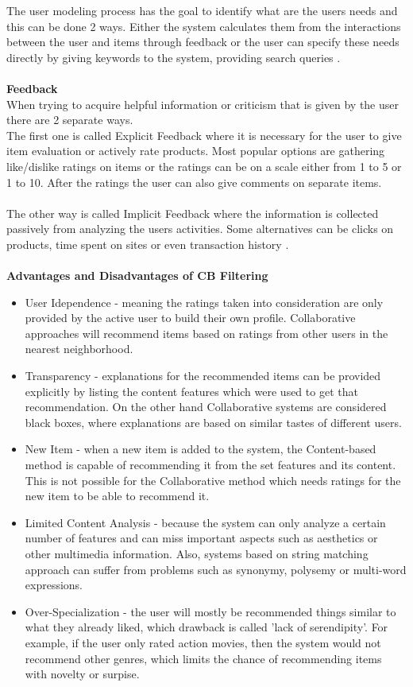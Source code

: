 \documentclass[\myFontSize,a4paper,oneside,english,hidelinks]{article}
\begin{document}
The user modeling process has the goal to identify what are the users needs and this can be done 2 ways. Either the system calculates them from the interactions between the user and items through feedback or the user can specify these needs directly by giving keywords to the system, providing search queries \cite{Beel2016305}. \\\\
%
%
\textbf{Feedback}\\
When trying to acquire helpful information or criticism that is given by the user there are 2 separate ways. \\
The first one is called Explicit Feedback where it is necessary for the user to give item evaluation or actively rate products. Most popular options are gathering like/dislike ratings on items or the ratings can be on a scale either from 1 to 5 or 1 to 10. After the ratings the user can also give comments on separate items. \\\\
The other way is called Implicit Feedback where the information is collected passively from analyzing the users activities. Some alternatives can be clicks on products, time spent on sites or even transaction history \cite{DeGemmis2015119}.\\\\
%
%
%
\textbf{Advantages and Disadvantages of CB Filtering}
\begin{itemize}
\item User Idependence - meaning the ratings taken into consideration are only provided by the active user to build their own profile. Collaborative approaches will recommend items based on ratings from other users in the nearest neighborhood.
\item Transparency - explanations for the recommended items can be provided explicitly by listing the content features which were used to get that recommendation. On the other hand Collaborative systems are considered black boxes, where explanations are based on similar tastes of different users.
\item New Item - when a new item is added to the system, the Content-based method is capable of recommending it from the set features and its content. This is not possible for the Collaborative method which needs ratings for the new item to be able to recommend it.
\item Limited Content Analysis - because the system can only analyze a certain number of features and can miss important aspects such as aesthetics or other multimedia information. Also, systems based on string matching approach can suffer from problems such as synonymy, polysemy or multi-word expressions.
\item Over-Specialization - the user will mostly be recommended things similar to what they already liked, which drawback is called 'lack of serendipity'. For example, if the user only rated action movies, then the system would not recommend other genres, which limits the chance of recommending items with novelty or surpise. \cite{DeGemmis2015119}\\
\end{itemize}
\end{document}
